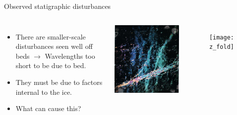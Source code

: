 \documentclass{beamer}
\begin{document}
\begin{frame}{Observed statigraphic disturbances}
   \begin{columns}[T]
     \begin{itemize}
       \item There are smaller-scale disturbances seen well off beds
       $\rightarrow$ Wavelengths too short to be due to bed.
    \item They must be due to factors internal to the ice.
    \item What can cause this?
     \end{itemize}
     \includegraphics[width=0.5\textheight]{stripes}
     \begin{figure}
     \texttt{[image: z\_fold]}
     \caption{\citet{alley97}}
  \end{figure}
     \end{columns}

\end{frame}
\end{document}
